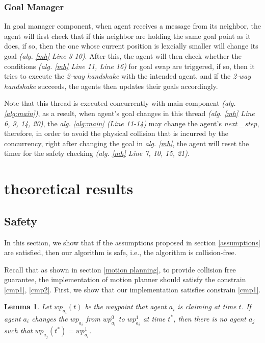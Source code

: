 \documentclass[journal]{IEEEtran}
\newtheorem{lemma}{Lemma}[subsection]
\begin{document}
\subsubsection{Goal Manager}
In goal manager component, when agent receives a message from its neighbor, the agent will first check that if this neighbor are holding the same goal point as it does, if so, then the one whose current position is lexcially smaller will change its goal \textit{(alg. \ref{mh} {Line 3-10})}. After this, the agent will then check whether the conditions \textit{(alg. \ref{mh} Line 11, Line 16)} for goal swap are triggered, if so, then it tries to execute the \textit{2-way handshake} with the intended agent, and if the \textit{2-way handshake} succeeds, the agents then updates their goals accordingly. 

Note that this thread is executed concurrently with main component \textit{(alg. \ref{alg:main})}, as a result, when agent's goal changes in this thread \textit{(alg. \ref{mh} Line 6, 9, 14, 20)}, the \textit{alg. \ref{alg:main} (Line 11-14)} may change the agent's \textit{next
\_step}, therefore, in order to avoid the physical collision that is incurred by the concurrency, right after changing the goal in \textit{alg. \ref{mh}}, the agent will reset the timer for the safety checking \textit{(alg. \ref{mh} Line 7, 10, 15, 21)}. 

\section{theoretical results}
\subsection{Safety}
\label{safety}

In this section, we show that if the assumptions proposed in section \ref{assumptions} are satisfied, then our algorithm is safe, i.e., the algorithm is collision-free. 


Recall that as shown in section \ref{motion planning}, to provide collision free guarantee, the implementation of motion planner should satisfy the constrain \ref{cmp1}, \ref{cmp2}. First, we show that our implementation satisfies constrain \ref{cmp1}.
\begin{lemma}
Let $wp_{a_i}(t)$ be the waypoint that agent $a_i$ is claiming at time $t$. If agent $a_i$ changes the $wp_{a_i}$ from $wp^0_{a_i}$ to $wp^1_{a_i}$ at time $t^*$, then there is no agent $a_j$ such that $wp_{a_j}(t^*) = wp^1_{a_i}$.
\label{induc}
\end{lemma}
\end{document}
